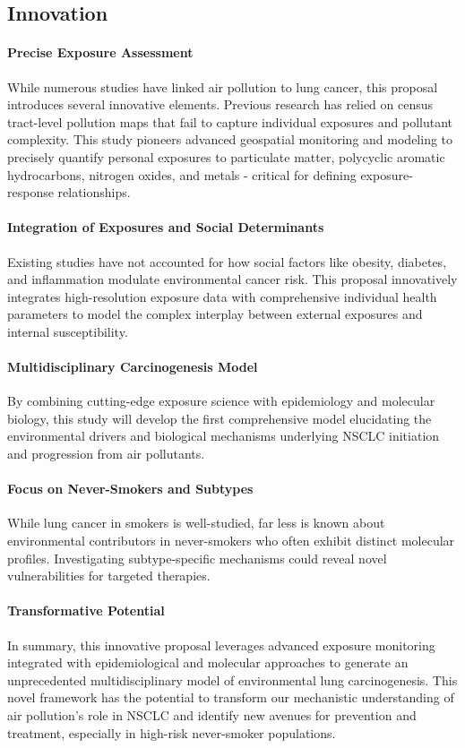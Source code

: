 \subsection{Innovation}


\paragraph{Precise Exposure Assessment}
While numerous studies have linked air pollution to lung cancer, this proposal introduces several innovative elements. 
Previous research has relied on census tract-level pollution maps that fail to capture individual exposures and pollutant complexity. 
This study pioneers advanced geospatial monitoring and modeling to precisely quantify personal exposures to particulate matter, 
polycyclic aromatic hydrocarbons, nitrogen oxides, and metals - critical for defining exposure-response relationships. 

\paragraph{Integration of Exposures and Social Determinants}
Existing studies have not accounted for how social factors like obesity, diabetes, and inflammation modulate environmental cancer risk. 
This proposal innovatively integrates high-resolution exposure data with comprehensive individual health parameters 
to model the complex interplay between external exposures and internal susceptibility. 

\paragraph{Multidisciplinary Carcinogenesis Model}
By combining cutting-edge exposure science with epidemiology and molecular biology, 
this study will develop the first comprehensive model elucidating the environmental drivers and biological mechanisms underlying NSCLC initiation and progression from air pollutants. 

\paragraph{Focus on Never-Smokers and Subtypes}
While lung cancer in smokers is well-studied, far less is known about environmental contributors in never-smokers who often exhibit distinct molecular profiles. 
Investigating subtype-specific mechanisms could reveal novel vulnerabilities for targeted therapies. 

\paragraph{Transformative Potential}
In summary, this innovative proposal leverages advanced exposure monitoring integrated with 
epidemiological and molecular approaches to generate an unprecedented multidisciplinary model of environmental lung carcinogenesis. 
This novel framework has the potential to transform our mechanistic understanding of air pollution's role in NSCLC and 
identify new avenues for prevention and treatment, especially in high-risk never-smoker populations.